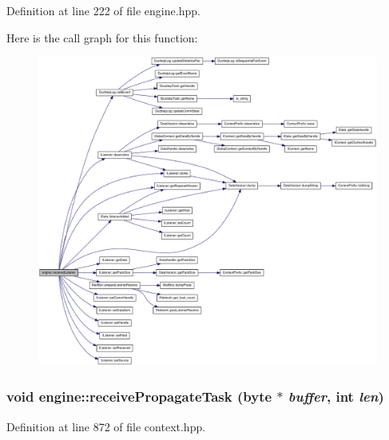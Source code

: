 Definition at line 222 of file engine.hpp.

Here is the call graph for this function:\nopagebreak
\begin{figure}[H]
\begin{center}
\leavevmode
\includegraphics[width=420pt]{classengine_ae0b940ebb7f5104cc2757bc9c92d0708_cgraph}
\end{center}
\end{figure}
\hypertarget{classengine_a21127e8807bf1984daa2806e056aef9c}{
\subsubsection[{receivePropagateTask}]{\setlength{\rightskip}{0pt plus 5cm}void engine::receivePropagateTask ({\bf byte} $\ast$ {\em buffer}, \/  int {\em len})}}
\label{classengine_a21127e8807bf1984daa2806e056aef9c}


Definition at line 872 of file context.hpp.

